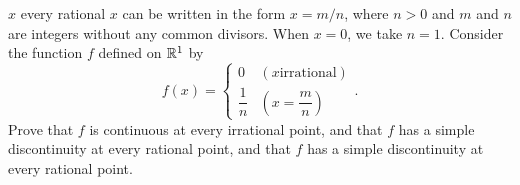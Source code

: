 \begin{example}[18]
	$x$ every rational $x$ can be written in the form $x=m/n$, where $n>0$ and $m$ and $n$ are integers without any common divisors. When $x=0$, we take $n=1$. Consider the function $f$ defined on $\mathbb{R}^{1}$ by
	\[
		f(x)=
		\begin{cases}
			0            & (x \text{irrational}) \\
			\dfrac{1}{n} & (x=\dfrac{m}{n})
		\end{cases}
		.\]
	Prove that $f$ is continuous at every irrational point, and that $f$ has a simple discontinuity at every rational point, and that $f$ has a simple discontinuity at every rational point.
\end{example}
